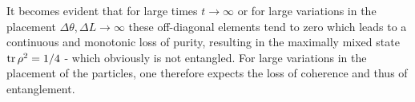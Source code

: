 It becomes evident that for large times $t\rightarrow \infty$ or for large variations in the placement $\Delta \theta, \Delta L \rightarrow \infty$ these off-diagonal elements tend to zero which leads to a continuous and monotonic loss of purity, resulting in the maximally mixed state $\tr\rho^2 = 1/4$ - which obviously is not entangled.
For large variations in the placement of the particles, one therefore expects the loss of coherence and thus of entanglement.

